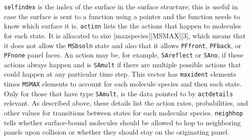 \documentclass {scrbook}
\newcommand {\ttt} {\texttt}
\begin{document}
\ttt{selfindex} is the index of the surface in the surface structure; this is useful in case the surface is sent to a function using a pointer and the function needs to know which surface it is. \ttt{action} lists the the actions that happen to molecules for each state. It is allocated to size [maxspecies][MSMAX][3], which means that it does not allow the \ttt{MSbsoln} state and also that it allows \ttt{PFfront}, \ttt{PFback}, or \ttt{PFnone} panel faces. An action may be, for example, \ttt{SAreflect} or \ttt{SAno}, if these actions always happen and is \ttt{SAmult} if there are multiple possible actions that could happen at any particular time step. This vector has \ttt{maxident} elements times \ttt{MSMAX} elements to account for each molecule species and then each state. Only for those that have type \ttt{SAmult}, is the data pointed to by \ttt{actdetails} relevant. As described above, these details list the action rates, probabilities, and other values for transitions between states for each molecular species. \ttt{neighhop} tells whether surface-bound molecules should be allowed to hop to neighboring panels upon collision or whether they should stay on the originating panel.
\end{document}
